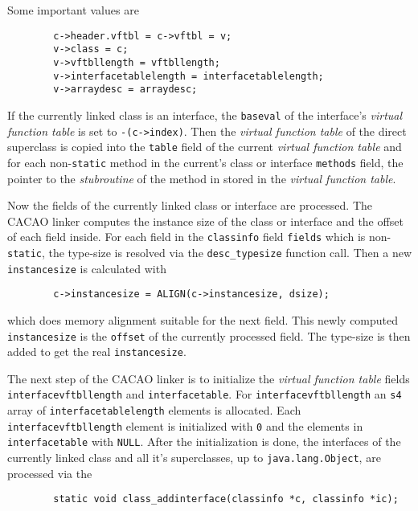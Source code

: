 Some important values are

\begin{verbatim}
        c->header.vftbl = c->vftbl = v;
        v->class = c;
        v->vftbllength = vftbllength;
        v->interfacetablelength = interfacetablelength;
        v->arraydesc = arraydesc;
\end{verbatim}

If the currently linked class is an interface, the \texttt{baseval} of
the interface's \textit{virtual function table} is set to
\texttt{-(c->index)}. Then the \textit{virtual function table} of the
direct superclass is copied into the \texttt{table} field of the
current \textit{virtual function table} and for each
non-\texttt{static} method in the current's class or interface
\texttt{methods} field, the pointer to the \textit{stubroutine} of the
method in stored in the \textit{virtual function table}.

Now the fields of the currently linked class or interface are
processed. The CACAO linker computes the instance size of the class or
interface and the offset of each field inside. For each field in the
\texttt{classinfo} field \texttt{fields} which is non-\texttt{static},
the type-size is resolved via the \texttt{desc\_typesize} function
call. Then a new \texttt{instancesize} is calculated with

\begin{verbatim}
        c->instancesize = ALIGN(c->instancesize, dsize);
\end{verbatim}

which does memory alignment suitable for the next field. This newly
computed \texttt{instancesize} is the \texttt{offset} of the currently
processed field. The type-size is then added to get the real
\texttt{instancesize}.

The next step of the CACAO linker is to initialize the \textit{virtual
function table} fields \texttt{interfacevftbllength} and
\texttt{interfacetable}. For \texttt{interfacevftbllength} an
\texttt{s4} array of \texttt{interfacetablelength} elements is
allocated. Each \texttt{interfacevftbllength} element is initialized
with \texttt{0} and the elements in \texttt{interfacetable} with
\texttt{NULL}. After the initialization is done, the interfaces of the
currently linked class and all it's superclasses, up to
\texttt{java.lang.Object}, are processed via the

\begin{verbatim}
        static void class_addinterface(classinfo *c, classinfo *ic);
\end{verbatim}

